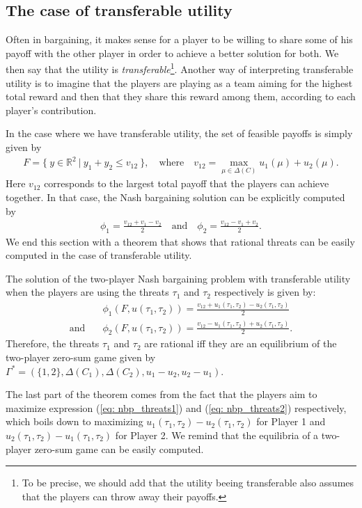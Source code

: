 \subsection{The case of transferable utility}



Often in bargaining, it makes sense for a player to be willing to share some of his payoff with the other player in order to achieve a better solution for both. We then say that the utility is \emph{transferable}\footnote{\footnotesize To be precise, we should add that the utility beeing transferable also assumes that the players can throw away their payoffs.}. Another way of interpreting transferable utility is to imagine that the players are playing as a team aiming for the highest total reward and then that they share this reward among them, according to each player's contribution.

In the case where we have transferable utility, the set of feasible payoffs is simply given by
\begin{align*}
	F = \{ \ y \in \mathbb{R}^2 \ | \ y_1 + y_2 \leq v_{12} \ \}, \quad \text{where} \quad v_{12} = \max_{\mu \in \Delta(C)} u_1(\mu) + u_2(\mu).
\end{align*}
Here $v_{12}$ corresponds to the largest total payoff that the players can achieve together. In that case, the Nash bargaining solution can be explicitly computed by
\begin{align*}
	\phi_1 = \frac{v_{12} + v_1 - v_2}{2} \quad \text{and} \quad \phi_2 = \frac{v_{12} - v_1 + v_2}{2}.
\end{align*}
We end this section with a theorem that shows that rational threats can be easily computed in the case of transferable utility.
\begin{theorem}
The solution of the two-player Nash bargaining problem with transferable utility when the players are using the threats $\tau_1$ and $\tau_2$ respectively is given by:
\begin{align}
	&\phi_1(F, u(\tau_1, \tau_2)) = \frac{v_{12} + u_1(\tau_1, \tau_2) - u_2(\tau_1, \tau_2)}{2}\label{eq: nbp_threats1}\\
	\text{and} \quad &\phi_2(F, u(\tau_1, \tau_2)) = \frac{v_{12} - u_1(\tau_1, \tau_2) + u_2(\tau_1, \tau_2)}{2}. \label{eq: nbp_threats2}
\end{align}
Therefore, the threats $\tau_1$ and $\tau_2$ are rational iff they are an equilibrium of the two-player zero-sum game given by $\Gamma^*=(\{1,2\}, \Delta(C_1), \Delta(C_2), u_1-u_2, u_2-u_1)$.
\end{theorem}
The last part of the theorem comes from the fact that the
players aim to maximize expression (\ref{eq: nbp_threats1}) and (\ref{eq: nbp_threats2}) respectively, which boils down to maximizing $u_1(\tau_1, \tau_2) - u_2(\tau_1, \tau_2)$ for Player 1 and $u_2(\tau_1, \tau_2) - u_1(\tau_1, \tau_2)$ for Player 2. We remind that the equilibria of a two-player zero-sum game can be easily computed.



